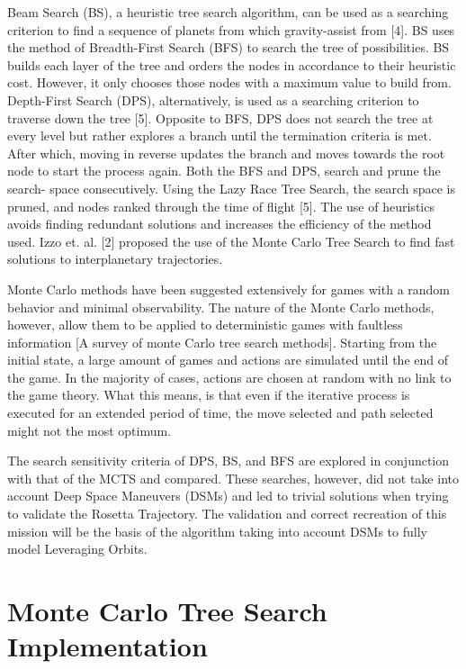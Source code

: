 \documentclass[letterpaper, preprint, paper,11pt]{AAS}	%
\begin{document}
Beam Search (BS), a heuristic tree search algorithm, can be used as a searching criterion to find a sequence of planets from which gravity-assist from [4]. BS uses the method of Breadth-First Search (BFS) to search the tree of possibilities. BS builds each layer of the tree and orders the nodes in accordance to their heuristic cost. However, it only chooses those nodes with a maximum value to build from. Depth-First Search (DPS), alternatively, is used as a searching criterion to traverse down the tree [5]. Opposite to BFS, DPS does not search the tree at every level but rather explores a branch until the termination criteria is met. After which, moving in reverse updates the branch and moves towards the root node to start the process again. Both the BFS and DPS, search and prune the search- space consecutively. Using the Lazy Race Tree Search, the search space is pruned, and nodes ranked through the time of flight [5]. The use of heuristics avoids finding redundant solutions and increases the efficiency of the method used. Izzo et. al. [2] proposed the use of the Monte Carlo Tree Search to find fast solutions to interplanetary trajectories.  

Monte Carlo methods have been suggested extensively for games with a random behavior and minimal observability. The nature of the Monte Carlo methods, however, allow them to be applied to deterministic games with faultless information [A survey of monte Carlo tree search methods]. Starting from the initial state, a large amount of games and actions are simulated until the end of the game. In the majority of cases, actions are chosen at random with no link to the game theory. What this means, is that even if the iterative process is executed for an extended period of time, the move selected and path selected might not the most optimum.  

The search sensitivity criteria of DPS, BS, and BFS are explored in conjunction with that of the MCTS and compared. These searches, however, did not take into account Deep Space Maneuvers (DSMs) and led to trivial solutions when trying to validate the Rosetta Trajectory. The validation and correct recreation of this mission will be the basis of the algorithm taking into account DSMs to fully model Leveraging Orbits. 

\section{Monte Carlo Tree Search Implementation}
\end{document}

